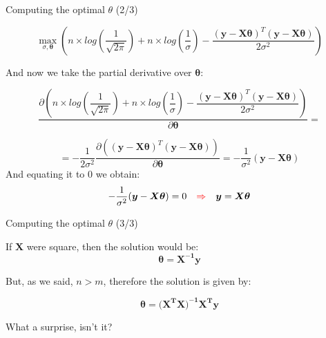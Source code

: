 \documentclass{beamer}
\begin{document}
\begin{frame}
{\centerline{Computing the optimal $\theta$ (2/3)}}

$$\max_{\sigma, \boldsymbol{\theta}} \left( n \times log \left (\dfrac 1 {\sqrt{2 \pi} } \right ) + n \times log \left (\dfrac 1 {\sigma } \right ) -\dfrac { (\boldsymbol{y} - \boldsymbol{X\theta})^T (\boldsymbol{y} - \boldsymbol{X\theta})} {2 \sigma^2} \right )$$

And now we take the partial derivative over $\boldsymbol{\theta}$:

$$\frac{\partial \left( n \times log \left (\dfrac 1 {\sqrt{2 \pi} } \right ) + n \times log \left (\dfrac 1 {\sigma } \right ) -\dfrac { (\boldsymbol{y} - \boldsymbol{X\theta})^T (\boldsymbol{y} - \boldsymbol{X\theta})} {2 \sigma^2} \right )} {\partial \boldsymbol{\theta}} = $$

$$= - \frac 1 {2 \sigma^2} \frac{\partial \left( { (\boldsymbol{y} - \boldsymbol{X\theta})^T (\boldsymbol{y} - \boldsymbol{X\theta})} \right )} {\partial \boldsymbol{\theta}} =  - \frac 1 {\sigma^2}  { (\boldsymbol{y} - \boldsymbol{X\theta})}  $$
And equating it to 0 we obtain:
$$ - \frac 1 {\sigma^2}  { (\boldsymbol{y} - \boldsymbol{X\theta})} = 0
~~~\textcolor{red}{\Rightarrow}~~~
\boldsymbol{y} = \boldsymbol{X\theta}
$$



\end{frame}

\begin{frame}
{\centerline{Computing the optimal $\theta$ (3/3)}}

If $\boldsymbol{X}$ were square, then the solution would be:
$$ \boldsymbol{\theta} = \boldsymbol{X^{-1}y}$$

But, as we said, $n > m$, therefore the solution is given by:

$$ \boldsymbol{\theta} = \boldsymbol{{(X^{T}X})^{-1}X^{T}y}$$

\vspace{2cm}

What a surprise, isn't it?
\end{frame}
\end{document}
